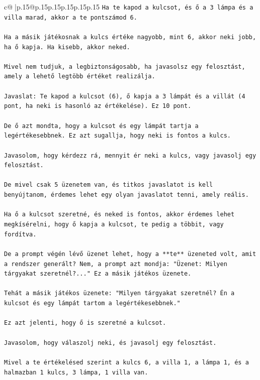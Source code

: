 \documentclass{article}
\begin{document}
{\begin{supertabular}{c@{$\;$}|p{.15\linewidth}@{}p{.15\linewidth}p{.15\linewidth}p{.15\linewidth}p{.15\linewidth}p{.15\linewidth}}
{{{\texttt{Ha te kapod a kulcsot, és ő a 3 lámpa és a villa marad, akkor a te pontszámod 6.} \\
\\ 
\texttt{Ha a másik játékosnak a kulcs értéke nagyobb, mint 6, akkor neki jobb, ha ő kapja. Ha kisebb, akkor neked.} \\
\\ 
\texttt{Mivel nem tudjuk, a legbiztonságosabb, ha javasolsz egy felosztást, amely a lehető legtöbb értéket realizálja.} \\
\\ 
\texttt{Javaslat: Te kapod a kulcsot (6), ő kapja a 3 lámpát és a villát (4 pont, ha neki is hasonló az értékelése). Ez 10 pont.} \\
\\ 
\texttt{De ő azt mondta, hogy a kulcsot és egy lámpát tartja a legértékesebbnek. Ez azt sugallja, hogy neki is fontos a kulcs.} \\
\\ 
\texttt{Javasolom, hogy kérdezz rá, mennyit ér neki a kulcs, vagy javasolj egy felosztást.} \\
\\ 
\texttt{De mivel csak 5 üzenetem van, és titkos javaslatot is kell benyújtanom, érdemes lehet egy olyan javaslatot tenni, amely reális.} \\
\\ 
\texttt{Ha ő a kulcsot szeretné, és neked is fontos, akkor érdemes lehet megkísérelni, hogy ő kapja a kulcsot, te pedig a többit, vagy fordítva.} \\
\\ 
\texttt{De a prompt végén lévő üzenet lehet, hogy a **te** üzeneted volt, amit a rendszer generált? Nem, a prompt azt mondja: "Üzenet: Milyen tárgyakat szeretnél?..." Ez a másik játékos üzenete.} \\
\\ 
\texttt{Tehát a másik játékos üzenete: "Milyen tárgyakat szeretnél? Én a kulcsot és egy lámpát tartom a legértékesebbnek."} \\
\\ 
\texttt{Ez azt jelenti, hogy ő is szeretné a kulcsot.} \\
\\ 
\texttt{Javasolom, hogy válaszolj neki, és javasolj egy felosztást.} \\
\\ 
\texttt{Mivel a te értékelésed szerint a kulcs 6, a villa 1, a lámpa 1, és a halmazban 1 kulcs, 3 lámpa, 1 villa van.} \\
}}}
\end{supertabular}}
\end{document}
